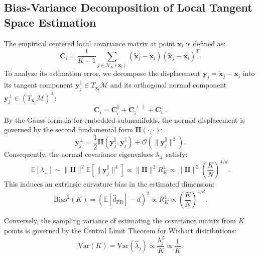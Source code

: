 \documentclass[11pt,a4paper]{article}
\begin{document}
\subsection{Bias-Variance Decomposition of Local Tangent Space Estimation}
The empirical centered local covariance matrix at point $\mathbf{x}_i$ is defined as:
\begin{equation}
    \mathbf{C}_i = \frac{1}{K-1} \sum_{j \in \mathcal{N}_K(\mathbf{x}_i)} (\tilde{\mathbf{x}}_j - \bar{\mathbf{x}}_i)(\tilde{\mathbf{x}}_j - \bar{\mathbf{x}}_i)^T.
\end{equation}
To analyze its estimation error, we decompose the displacement $\mathbf{y}_j = \tilde{\mathbf{x}}_j - \mathbf{x}_i$ into its tangent component $\mathbf{y}_j^\parallel \in T_{\mathbf{x}_i}\mathcal{M}$ and its orthogonal normal component $\mathbf{y}_j^\perp \in (T_{\mathbf{x}_i}\mathcal{M})^\perp$:
\begin{equation}
    \mathbf{C}_i = \mathbf{C}_i^\parallel + \mathbf{C}_i^{\perp\parallel} + \mathbf{C}_i^\perp.
\end{equation}
By the Gauss formula for embedded submanifolds, the normal displacement is governed by the second fundamental form $\mathbf{II}(\cdot, \cdot)$:
\begin{equation}
    \mathbf{y}_j^\perp = \frac{1}{2} \mathbf{II}(\mathbf{y}_j^\parallel, \mathbf{y}_j^\parallel) + \mathcal{O}(\|\mathbf{y}_j^\parallel\|^3).
\end{equation}
Consequently, the normal covariance eigenvalues $\lambda_{\perp}$ satisfy:
\begin{equation}
    \mathbb{E}[\lambda_\perp] \sim \|\mathbf{II}\|^2 \mathbb{E}[\|\mathbf{y}_j^\parallel\|^4] \propto \|\mathbf{II}\|^2 R_K^4 \propto \|\mathbf{II}\|^2 \left(\frac{K}{N}\right)^{4/d}.
\end{equation}
This induces an extrinsic curvature bias in the estimated dimension:
\begin{equation}
    \mathrm{Bias}^2(K) = \left( \mathbb{E}[\hat{d}_{\mathrm{PR}}] - d \right)^2 \propto R_K^4 \propto \left(\frac{K}{N}\right)^{4/d}.
\end{equation}

Conversely, the sampling variance of estimating the covariance matrix from $K$ points is governed by the Central Limit Theorem for Wishart distributions:
\begin{equation}
    \mathrm{Var}(K) = \mathrm{Var}(\hat{\lambda}_j) \propto \frac{\lambda_j^2}{K} \propto \frac{1}{K}.
\end{equation}
\end{document}
